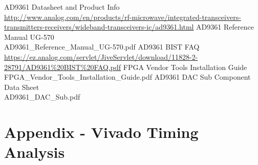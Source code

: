 \documentclass{article}
\begin{document}
\pagebreak
\begin{thebibliography}{1}

 AD9361 Datasheet and Product Info \\
\url{http://www.analog.com/en/products/rf-microwave/integrated-transceivers-transmitters-receivers/wideband-transceivers-ic/ad9361.html}
 AD9361 Reference Manual UG-570\\
AD9361\_Reference\_Manual\_UG-570.pdf
 AD9361 BIST FAQ \\
\url{https://ez.analog.com/servlet/JiveServlet/download/11828-2-28791/AD9361%20BIST%20FAQ.pdf}
 FPGA Vendor Tools Installation Guide \\
FPGA\_Vendor\_Tools\_Installation\_Guide.pdf
 AD9361 DAC Sub Component Data Sheet \\AD9361\_DAC\_Sub.pdf

\end{thebibliography}
\pagebreak
\section{Appendix - Vivado Timing Analysis} \label{appendix}
\end{document}
